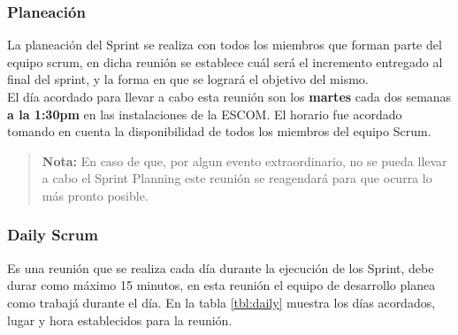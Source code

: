 \subsubsection{Planeación}

 La planeación del Sprint se realiza con todos los miembros que forman parte del equipo scrum,
 en dicha reunión se establece cuál será el incremento entregado al final del sprint, y la forma
 en que se logrará el objetivo del mismo.\\

 \noindent El día acordado para llevar a cabo esta reunión son los {\bf martes} cada dos semanas
 {\bf a la 1:30pm} en las instalaciones de la ESCOM. El horario fue acordado tomando en cuenta
 la disponibilidad de todos los miembros del equipo Scrum.
    
    \begin{quote}
    {\bf Nota:} En caso de que, por algun evento extraordinario, no se pueda
                llevar a cabo el Sprint Planning este reunión se reagendará para
                que ocurra lo más pronto posible.
    \end{quote}
  
\subsubsection{Daily Scrum}

 Es una reunión que se realiza cada día durante la ejecución de los Sprint, debe durar como
 máximo 15 minutos, en esta reunión el equipo de desarrollo planea como trabajá durante el día.
 En la tabla \ref{tbl:daily} muestra los días acordados, lugar y hora establecidos para la reunión.

     
   
    
